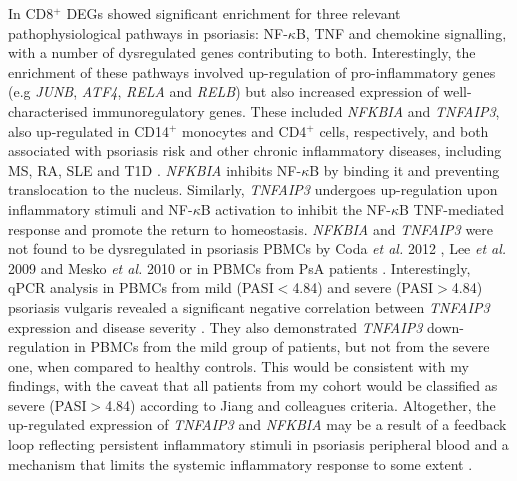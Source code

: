 In CD8$^+$ DEGs showed significant enrichment for three relevant pathophysiological pathways in psoriasis: NF-$\kappa$B, TNF and chemokine signalling, with a number of dysregulated genes contributing to both. Interestingly, the enrichment of these pathways involved up-regulation of pro-inflammatory genes (e.g \textit{JUNB}, \textit{ATF4}, \textit{RELA} and \textit{RELB}) but also increased expression of well-characterised immunoregulatory genes. These included \textit{NFKBIA} and \textit{TNFAIP3}, also up-regulated in CD14$^+$ monocytes and CD4$^+$ cells, respectively, and both associated with psoriasis risk and other chronic inflammatory diseases, including MS, RA, SLE and T1D \parencite{Vereecke2011}. \textit{NFKBIA} inhibits NF-$\kappa$B by binding it and preventing translocation to the nucleus. Similarly, \textit{TNFAIP3} undergoes up-regulation upon inflammatory stimuli and NF-$\kappa$B activation to inhibit the NF-$\kappa$B TNF-mediated response and promote the return to homeostasis. \textit{NFKBIA} and \textit{TNFAIP3} were not found to be dysregulated in psoriasis PBMCs by Coda \textit{et al.} 2012 , Lee \textit{et al.} 2009 and Mesko \textit{et al.} 2010 or in PBMCs from PsA patients  \parencite{Dolcino2015}. Interestingly, qPCR analysis in PBMCs from mild (PASI$<$4.84) and severe (PASI$>$4.84) psoriasis vulgaris revealed a significant negative correlation between \textit{TNFAIP3} expression and disease severity \parencite{Jiang2012}. They also demonstrated \textit{TNFAIP3} down-regulation in PBMCs from the mild group of patients, but not from the severe one, when compared to healthy controls. This would be consistent with my findings, with the caveat that all patients from my cohort would be classified as severe (PASI$>$4.84) according to Jiang and colleagues criteria. Altogether, the up-regulated expression of \textit{TNFAIP3} and \textit{NFKBIA} may be a result of a feedback loop reflecting persistent inflammatory stimuli in psoriasis peripheral blood and a mechanism that limits the systemic inflammatory response to some extent \parencite{Idel2003}. 

